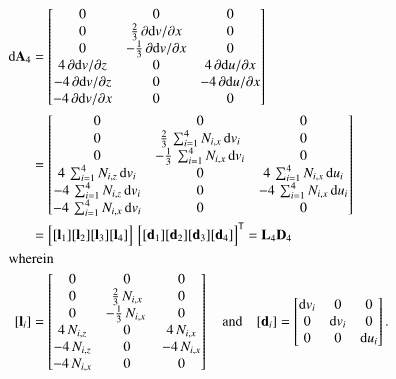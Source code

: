 \begin{subequations}
	\begin{align}
		\mathrm{d} \mathbf{A}_4 & =  \begin{bmatrix}
			0 & 0 &  0   \\
			0 &  \tfrac{2}{3} \, \partial \mathrm{d} v / \partial x & 0  \\
			0 &  - \tfrac{1}{3} \, \partial \mathrm{d} v / \partial x & 0 \\
			4 \, \partial \mathrm{d} v / \partial z &  0 & 4 \, \partial \mathrm{d} u / \partial x  \\
			-4 \, \partial \mathrm{d} v / \partial z &  0 & -4 \, \partial \mathrm{d} u / \partial x  \\
			-4 \, \partial \mathrm{d} v / \partial x &  0 & 0  \end{bmatrix} \notag\\
		& = \begin{bmatrix}
			0 &  0 &  0  \\
			0 &  \tfrac{2}{3} \, \sum\nolimits_{i=1}^4 N_{i,x} \, \mathrm{d} v_i & 0  \\
			0 &  - \tfrac{1}{3} \, \sum\nolimits_{i=1}^4 N_{i,x} \, \mathrm{d} v_i & 0  \\
			4 \, \sum\nolimits_{i=1}^4 N_{i,z} \, \mathrm{d} v_i &  0 & 4 \, \sum\nolimits_{i=1}^4 N_{i,x} \, \mathrm{d} u_i  \\
			-4 \, \sum\nolimits_{i=1}^4 N_{i,z} \, \mathrm{d} v_i &  0 & - 4 \, \sum\nolimits_{i=1}^4 N_{i,x} \, \mathrm{d} u_i  \\
			- 4 \, \sum\nolimits_{i=1}^4 N_{i,x} \, \mathrm{d} v_i &  0 & 0  \end{bmatrix} \notag \\	
		& = \begin{bmatrix}
			[\mathbf{l}_1] [\mathbf{l}_2] [\mathbf{l}_3] [\mathbf{l}_4] 
		\end{bmatrix}  \, \begin{bmatrix} [\mathbf{d}_1] [\mathbf{d}_2] [\mathbf{d}_3] [\mathbf{d}_4] \end{bmatrix}^{\mathsf{T}}
	= \mathbf{L}_4 \mathbf{D}_4 \\
		\intertext{wherein}
		[\mathbf{l}_i] & = \begin{bmatrix}
			0 &  0 &  0  \\
			0 &  \tfrac{2}{3} \, N_{i,x}  & 0  \\
			0 &  - \tfrac{1}{3} \,  N_{i,x} \,  & 0  \\
			4 \,  N_{i,z}  &  0 & 4 \,  N_{i,x}   \\
			-4 \,  N_{i,z} &  0 & - 4 \,  N_{i,x}  \\
			- 4 \,  N_{i,x} &  0 & 0  \end{bmatrix}   \quad \text{and} \quad	[\mathbf{d}_i] = \begin{bmatrix}
			\mathrm{d} v_i & 0  & 0  \\
			0 &  \mathrm{d} v_i   & 0  \\
			0 & 0 & \mathrm{d} u_i \end{bmatrix} .
	\end{align}
\end{subequations}

